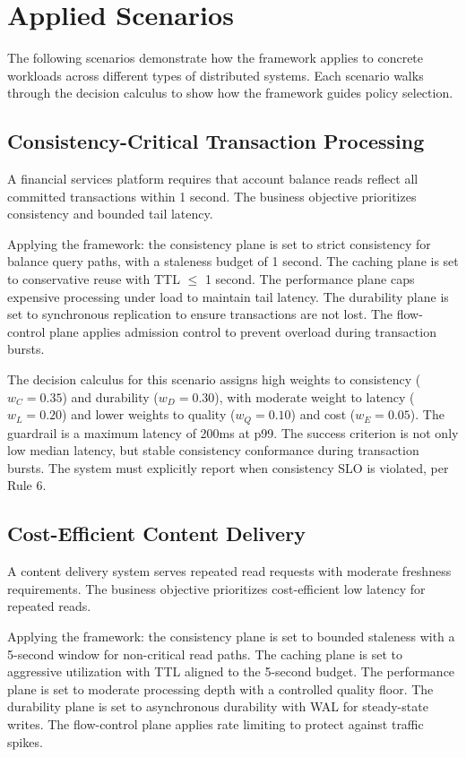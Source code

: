 \documentclass[conference]{IEEEtran}
\begin{document}
\section{Applied Scenarios}

The following scenarios demonstrate how the framework applies to concrete workloads across different types of distributed systems. Each scenario walks through the decision calculus to show how the framework guides policy selection.

\subsection{Consistency-Critical Transaction Processing}

A financial services platform requires that account balance reads reflect all committed transactions within 1 second. The business objective prioritizes consistency and bounded tail latency.

Applying the framework: the consistency plane is set to strict consistency for balance query paths, with a staleness budget of 1 second. The caching plane is set to conservative reuse with TTL $\leq$ 1 second. The performance plane caps expensive processing under load to maintain tail latency. The durability plane is set to synchronous replication to ensure transactions are not lost. The flow-control plane applies admission control to prevent overload during transaction bursts.

The decision calculus for this scenario assigns high weights to consistency ($w_C = 0.35$) and durability ($w_D = 0.30$), with moderate weight to latency ($w_L = 0.20$) and lower weights to quality ($w_Q = 0.10$) and cost ($w_E = 0.05$). The guardrail is a maximum latency of 200ms at p99. The success criterion is not only low median latency, but stable consistency conformance during transaction bursts. The system must explicitly report when consistency SLO is violated, per Rule 6.

\subsection{Cost-Efficient Content Delivery}

A content delivery system serves repeated read requests with moderate freshness requirements. The business objective prioritizes cost-efficient low latency for repeated reads.

Applying the framework: the consistency plane is set to bounded staleness with a 5-second window for non-critical read paths. The caching plane is set to aggressive utilization with TTL aligned to the 5-second budget. The performance plane is set to moderate processing depth with a controlled quality floor. The durability plane is set to asynchronous durability with WAL for steady-state writes. The flow-control plane applies rate limiting to protect against traffic spikes.
\end{document}
